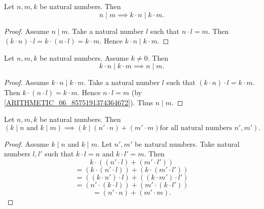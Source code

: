\documentclass[10pt]{article}
\begin{document}
  \begin{forthel}
    \begin{proposition}
      Let $n, m, k$ be natural numbers.
      Then \[ n \mid m \implies k \cdot n \mid k \cdot m. \]
    \end{proposition}
    \begin{proof}
      Assume $n \mid m$.
      Take a natural number $l$ such that $n \cdot l = m$.
      Then $(k \cdot n) \cdot l
        = k \cdot (n \cdot l)
        = k \cdot m$.
      Hence $k \cdot n \mid k \cdot m$.
    \end{proof}
  \end{forthel}

  \begin{forthel}
    \begin{proposition}
      Let $n, m, k$ be natural numbers.
      Assume $k \neq 0$.
      Then \[ k \cdot n \mid k \cdot m \implies n \mid m. \]
    \end{proposition}
    \begin{proof}
      Assume $k \cdot n \mid k \cdot m$.
      Take a natural number $l$ such that $(k \cdot n) \cdot l = k \cdot m$.
      Then $k \cdot (n \cdot l) = k \cdot m$.
      Hence $n \cdot l = m$ (by \cref{ARITHMETIC_06_8575191374364672}).
      Thus $n \mid m$.
    \end{proof}
  \end{forthel}

  \begin{forthel}
    \begin{proposition}
      Let $n, m, k$ be natural numbers.
      Then \[ (\text{$k \mid n$ and $k \mid m$}) \implies
      (\text{$k \mid (n' \cdot n) + (m' \cdot m)$
      for all natural numbers $n', m'$}). \]
    \end{proposition}
    \begin{proof}
      Assume $k \mid n$ and $k \mid m$.
      Let $n', m'$ be natural numbers.
      Take natural numbers $l,l'$ such that $k \cdot l = n$ and $k \cdot l' = m$.
      Then
      \[  k \cdot ((n' \cdot l) + (m' \cdot l'))                \]
      \[    = (k \cdot (n' \cdot l)) + (k \cdot (m' \cdot l'))  \]
      \[    = ((k \cdot n') \cdot l) + ((k \cdot m') \cdot l')  \]
      \[    = (n' \cdot (k \cdot l)) + (m' \cdot (k \cdot l'))  \]
      \[    = (n' \cdot n) + (m' \cdot m).                      \]
    \end{proof}
  \end{forthel}
\end{document}
